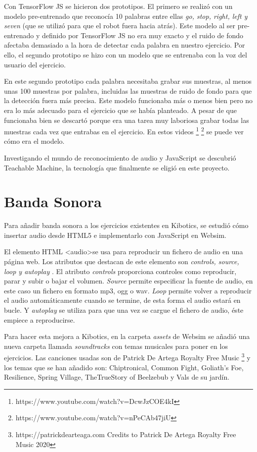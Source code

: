 Con TensorFlow JS se hicieron dos prototipos. El primero se realizó con un modelo pre-entrenado que reconocía 10 palabras entre ellas \textit{go, stop, right, left y seven} (que se utilizó para que el robot fuera hacia atrás).
Este modelo al ser pre-entrenado y definido por TensorFlow JS no era muy exacto y el ruido de fondo afectaba demasiado a la hora de detectar cada palabra en nuestro ejercicio. Por ello, el segundo prototipo se hizo con un modelo que se entrenaba con la voz del usuario del ejercicio.

En este segundo prototipo cada palabra necesitaba grabar sus muestras, al menos unas 100 muestras por palabra, incluidas las muestras de ruido de fondo para que la detección fuera más precisa. Este modelo funcionaba más o menos bien pero no era lo más adecuado para el ejercicio que se había planteado. A pesar de que funcionaba bien se descartó porque era una tarea muy laboriosa grabar todas las muestras cada vez que entrabas en el ejercicio. 
En estos videos \footnote{https://www.youtube.com/watch?v=DcwJzCOE4kI}
\footnote{https://www.youtube.com/watch?v=nPeCAb47jiU} se puede ver cómo era el modelo.

Investigando el mundo de reconocimiento de audio y JavaScript se descubrió Teachable Machine, la tecnología que finalmente se eligió en este proyecto.


\section{Banda Sonora}

Para añadir banda sonora a los ejercicios existentes en Kibotics, se estudió cómo insertar audio desde HTML5 e implementarlo con JavaScript en Websim.

El elemento HTML \textless audio\textgreater  se usa para reproducir un fichero de audio en una página web.
Los atributos que destacan de este elemento son \textit{controls, source, loop y autoplay }.
El atributo \textit{controls} proporciona controles como reproducir, parar y subir o bajar el volumen.
 \textit{Source} permite especificar la fuente de audio, en este caso un fichero en formato mp3, ogg o wav. \textit{Loop} permite volver a reproducir el audio automáticamente cuando se termine, de esta forma  el audio estará en bucle. Y \textit{autoplay} se utiliza para que una vez se cargue el fichero de audio, éste empiece a reproducirse.

Para hacer esta mejora a Kibotics, en la carpeta \textit{assets} de Websim se añadió una nueva carpeta llamada \textit{soundtracks} con temas musicales para poner en los ejercicios. Las canciones usadas son de Patrick De Artega Royalty Free Music  \footnote{ https://patrickdearteaga.com Credits to Patrick De Artega Royalty Free Music 2020}
y los temas que se han añadido son:
Chiptronical, Common Fight, Goliath's Foe, Resilience, Spring Village, TheTrueStory of Beelzebub y Vals de su jardín.


